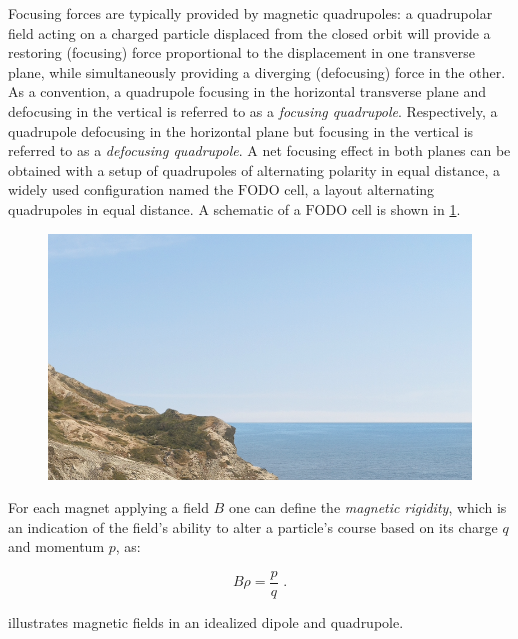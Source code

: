 Focusing forces are typically provided by magnetic quadrupoles: a quadrupolar field acting on a charged particle displaced from the closed orbit will provide a restoring (focusing) force proportional to the displacement in one transverse plane, while simultaneously providing a diverging (defocusing) force in the other. 
As a convention, a quadrupole focusing in the horizontal transverse plane and defocusing in the vertical is referred to as a \emph{focusing quadrupole}. 
Respectively, a quadrupole defocusing in the horizontal plane but focusing in the vertical is referred to as a \emph{defocusing quadrupole}.
A net focusing effect in both planes can be obtained with a setup of quadrupoles of alternating polarity in equal distance, a widely used configuration named the \(\mathrm{FODO}\) cell, a layout alternating quadrupoles in equal distance.
A schematic of a \(\mathrm{FODO}\) cell is shown in \cref{figure:fodo_cell_schematic}.

\begin{figure}[!htb]
    \begin{center}
    \includegraphics[width = 0.8\linewidth]{Figures/placeholder.png}
    \caption{}
    \label{figure:fodo_cell_schematic}
    \end{center}
\end{figure}

For each magnet applying a field \(B\) one can define the \emph{magnetic rigidity}, which is an indication of the field’s ability to alter a particle’s course based on its charge \(q\) and momentum \(p\), as:

\begin{equation}
    B \rho = \frac{p}{q} \text{ .}
    \label{equation:magnetic_rigidity}
\end{equation}

 illustrates magnetic fields in an idealized dipole and quadrupole.

